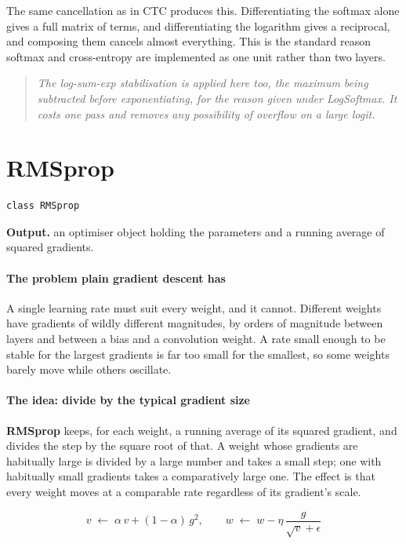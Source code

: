 The same cancellation as in CTC produces this. Differentiating the softmax alone gives a full matrix of terms, and differentiating the logarithm gives a reciprocal, and composing them cancels almost everything. This is the standard reason softmax and cross-entropy are implemented as one unit rather than two layers.


\begin{quote}\small\itshape The log-sum-exp stabilisation is applied here too, the maximum being subtracted before exponentiating, for the reason given under LogSoftmax. It costs one pass and removes any possibility of overflow on a large logit.\end{quote}

\section{RMSprop}
\begin{lstlisting}[style=sig]
class RMSprop
\end{lstlisting}

\noindent\textbf{Output.} an optimiser object holding the parameters and a running average of squared gradients.


\paragraph{The problem plain gradient descent has}
A single learning rate must suit every weight, and it cannot. Different weights have gradients of wildly different magnitudes, by orders of magnitude between layers and between a bias and a convolution weight. A rate small enough to be stable for the largest gradients is far too small for the smallest, so some weights barely move while others oscillate.


\paragraph{The idea: divide by the typical gradient size}
\textbf{RMSprop} \cite{tieleman2012} keeps, for each weight, a running average of its squared gradient, and divides the step by the square root of that. A weight whose gradients are habitually large is divided by a large number and takes a small step; one with habitually small gradients takes a comparatively large one. The effect is that every weight moves at a comparable rate regardless of its gradient's scale.


\begin{equation}
v \;\leftarrow\; \alpha\,v + (1-\alpha)\,g^2, \qquad w \;\leftarrow\; w - \eta\,\frac{g}{\sqrt{v} + \epsilon}
\end{equation}


